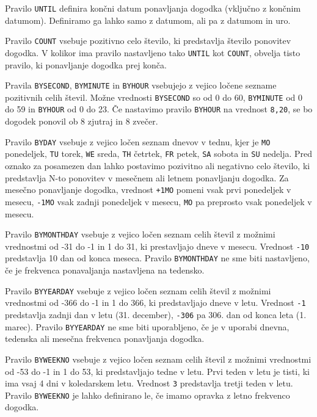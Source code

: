 Pravilo \texttt{UNTIL} definira končni datum ponavljanja dogodka (vključno z končnim datumom). Definiramo ga lahko samo z datumom, ali pa z datumom in uro.

Pravilo \texttt{COUNT} vsebuje pozitivno celo število, ki predstavlja število ponovitev dogodka. V kolikor ima pravilo nastavljeno tako \texttt{UNTIL} kot \texttt{COUNT}, obvelja tisto pravilo, ki ponavljanje dogodka prej konča.

Pravila \texttt{BYSECOND}, \texttt{BYMINUTE} in \texttt{BYHOUR} vsebujejo z vejico ločene sezname pozitivnih celih števil. Možne vrednosti \texttt{BYSECOND} so od 0 do 60, \texttt{BYMINUTE} od 0 do 59 in \texttt{BYHOUR} od 0 do 23. Če nastavimo pravilo \texttt{BYHOUR} na vrednost \texttt{8,20}, se bo dogodek ponovil ob 8 zjutraj in 8 zvečer.

Pravilo \texttt{BYDAY} vsebuje z vejico ločen seznam dnevov v tednu, kjer je \texttt{MO} ponedeljek, \texttt{TU} torek, \texttt{WE} sreda, \texttt{TH} četrtek, \texttt{FR} petek, \texttt{SA} sobota in \texttt{SU} nedelja. Pred oznako za posamezen dan lahko postavimo pozivitno ali negativno celo število, ki predstavlja N-to ponovitev v mesečnem ali letnem ponavljanju dogodka. Za mesečno ponavljanje dogodka, vrednost \texttt{+1MO} pomeni vsak prvi ponedeljek v mesecu, \texttt{-1MO} vsak zadnji ponedeljek v mesecu, \texttt{MO} pa preprosto vsak ponedeljek v mesecu.

Pravilo \texttt{BYMONTHDAY} vsebuje z vejico ločen seznam celih števil z možnimi vrednostmi od -31 do -1 in 1 do 31, ki prestavljajo dneve v mesecu. Vrednost \texttt{-10} predstavlja 10 dan od konca meseca. Pravilo \texttt{BYMONTHDAY} ne sme biti nastavljeno, če je frekvenca ponavaljanja nastavljena na tedensko.

Pravilo \texttt{BYYEARDAY} vsebuje z vejico ločen seznam celih števil z možnimi vrednostmi od -366 do -1 in 1 do 366, ki predstavljajo dneve v letu. Vrednost \texttt{-1} predstavlja zadnji dan v letu (31. december), \texttt{-306} pa 306. dan od konca leta (1. marec). Pravilo \texttt{BYYEARDAY} ne sme biti uporabljeno, če je v uporabi dnevna, tedenska ali mesečna frekvenca ponavljanja dogodka.

Pravilo \texttt{BYWEEKNO} vsebuje z vejico ločen seznam celih števil z možnimi vrednostmi od -53 do -1 in 1 do 53, ki predstavljajo tedne v letu. Prvi teden v letu je tisti, ki ima vsaj 4 dni v koledarskem letu. Vrednost \texttt{3} predstavlja tretji teden v letu. Pravilo \texttt{BYWEEKNO} je lahko definirano le, če imamo opravka z letno frekvenco dogodka.

